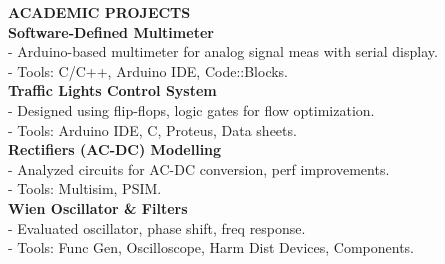 \documentclass{article}
\begin{document}
\begin{minipage}[t]{0.66\textwidth}
\vspace{1.5em}
{\color{sectionteal}\large\bfseries ACADEMIC PROJECTS} \\[0.05em]
\textbf{Software-Defined Multimeter} \\
- Arduino-based multimeter for analog signal meas with serial display. \\
- Tools: C/C++, Arduino IDE, Code::Blocks. \\[0.3em]
\textbf{Traffic Lights Control System} \\
- Designed using flip-flops, logic gates for flow optimization. \\
- Tools: Arduino IDE, C, Proteus, Data sheets. \\[0.3em]
\textbf{Rectifiers (AC-DC) Modelling} \\
- Analyzed circuits for AC-DC conversion, perf improvements. \\
- Tools: Multisim, PSIM. \\[0.3em]
\textbf{Wien Oscillator \& Filters} \\
- Evaluated oscillator, phase shift, freq response. \\
- Tools: Func Gen, Oscilloscope, Harm Dist Devices, Components.
\end{minipage}
\end{document}
